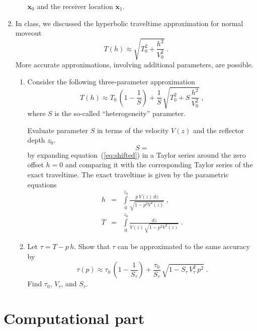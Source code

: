 \begin{enumerate}
\begin{enumerate}
    $\mathbf{x}_0$ and the receiver location $\mathbf{x}_1$.
  \end{enumerate}
\item In class, we discussed the hyperbolic traveltime approximation for normal moveout
  \begin{equation}
  \label{eq:hyper2}
  T(h) \approx \sqrt{T_0^2 + \frac{h^2}{V_0^2}}\;.
\end{equation}
More accurate approximations, involving additional parameters, are possible.
\begin{enumerate}
\item Consider the following three-parameter approximation
  \begin{equation}
    \label{eq:shifted}
    T(h) \approx T_0\,\left(1-\frac{1}{S}\right) + 
\frac{1}{S}\,\sqrt{T_0^2+S\,\frac{h^2}{V_0^2}}\;,
  \end{equation}
  where $S$ is the so-called ``heterogeneity'' parameter. 

Evaluate parameter $S$ in terms of the velocity $V(z)$ and the reflector depth $z_0$.
\begin{equation}
  \label{eq:a}
  S =
\end{equation}
by expanding
  equation~(\ref{eq:shifted}) in a Taylor series around the zero offset
  $h=0$ and comparing it with the corresponding Taylor series of the exact
  traveltime. The exact traveltime is given by the parametric equations
  \begin{eqnarray}
\label{eq:xofp}
h & = & \int\limits_0^{z_0} \frac{p\,V(z)\,dz}{\sqrt{1-p^2 V^2(z)}}\;, \\
\label{eq:tofp}
T & = & \int\limits_0^{z_0} \frac{dz}{V(z)\,\sqrt{1-p^2 V^2(z)}}\;.
\end{eqnarray}
\item Let $\tau = T-p\,h$. Show that $\tau$ can be approximated to the same accuracy by
\begin{equation}
    \label{eq:tauofp}
    \tau(p) \approx \tau_0\,\left(1-\frac{1}{S_{\tau}}\right) + 
\frac{\tau_0}{S_{\tau}}\,\sqrt{1-S_{\tau}\,{V_{\tau}^2}\,p^2}\;.
  \end{equation}
Find $\tau_0$, $V_{\tau}$, and $S_{\tau}$.
\end{enumerate}
\end{enumerate}

\lstset{language=python,numbers=left,numberstyle=\tiny,showstringspaces=false}

\newpage


\section{Computational part}

